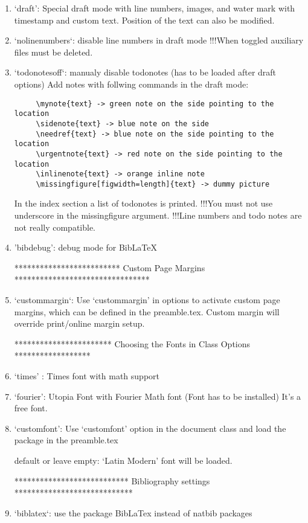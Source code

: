 \begin{enumerate}
\item`draft': Special draft mode with line numbers, images, and water mark
 with timestamp and custom text. Position of the text can also be modified.

\item`nolinenumbers`: disable line numbers in draft mode
 !!!When toggled auxiliary files must be deleted.

\item`todonotesoff`: manualy disable todonotes (has to be loaded after draft options)
 Add notes with follwing commands in the draft mode:
 \begin{verbatim}
	 \mynote{text} -> green note on the side pointing to the location
	 \sidenote{text} -> blue note on the side
	 \needref{text}	-> blue note on the side pointing to the location
	 \urgentnote{text} -> red note on the side pointing to the location
	 \inlinenote{text} -> orange inline note
	 \missingfigure[figwidth=length]{text} -> dummy picture
 \end{verbatim}
 In the index section a list of todonotes is printed.
 !!!You must not use underscore in the missingfigure argument.
 !!!Line numbers and todo notes are not really compatible.

\item'bibdebug': debug mode for BibLaTeX

 ************************* Custom Page Margins ********************************
\item`custommargin`: Use `custommargin' in options to activate custom page margins,
 which can be defined in the preamble.tex. Custom margin will override
 print/online margin setup.

 *********************** Choosing the Fonts in Class Options ******************
\item`times' : Times font with math support

\item`fourier': Utopia Font with Fourier Math font (Font has to be installed)
            It's a free font.

\item`customfont': Use `customfont' option in the document class and load the
 package in the preamble.tex

 default or leave empty: `Latin Modern' font will be loaded.

 *************************** Bibliography settings ****************************
\item`biblatex`: use the package BibLaTex instead of natbib packages


\end{enumerate}
